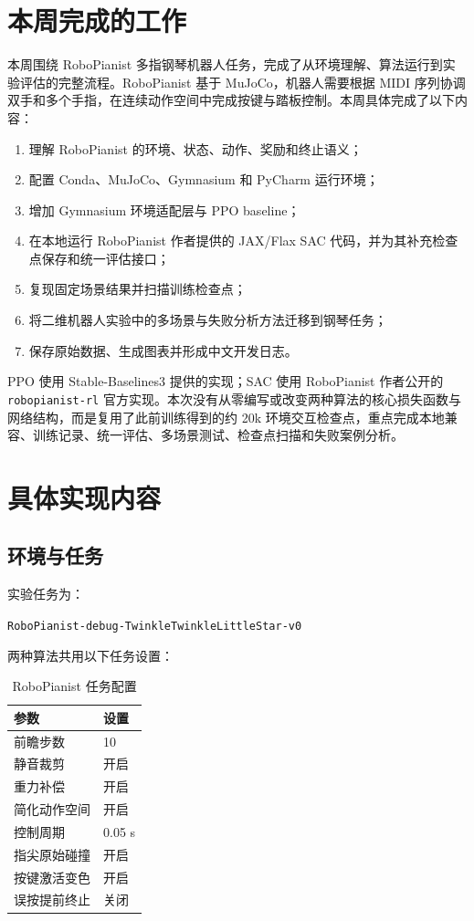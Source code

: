 \documentclass[UTF8,a4paper,11pt]{ctexart}
\begin{document}
\section{本周完成的工作}

本周围绕 RoboPianist 多指钢琴机器人任务，完成了从环境理解、算法运行到实验评估的完整流程。RoboPianist 基于 MuJoCo，机器人需要根据 MIDI 序列协调双手和多个手指，在连续动作空间中完成按键与踏板控制。本周具体完成了以下内容：
\begin{enumerate}
  \item 理解 RoboPianist 的环境、状态、动作、奖励和终止语义；
  \item 配置 Conda、MuJoCo、Gymnasium 和 PyCharm 运行环境；
  \item 增加 Gymnasium 环境适配层与 PPO baseline；
  \item 在本地运行 RoboPianist 作者提供的 JAX/Flax SAC 代码，并为其补充检查点保存和统一评估接口；
  \item 复现固定场景结果并扫描训练检查点；
  \item 将二维机器人实验中的多场景与失败分析方法迁移到钢琴任务；
  \item 保存原始数据、生成图表并形成中文开发日志。
\end{enumerate}

PPO 使用 Stable-Baselines3 提供的实现；SAC 使用 RoboPianist 作者公开的 \texttt{robopianist-rl} 官方实现。本次没有从零编写或改变两种算法的核心损失函数与网络结构，而是复用了此前训练得到的约 20k 环境交互检查点，重点完成本地兼容、训练记录、统一评估、多场景测试、检查点扫描和失败案例分析。

\section{具体实现内容}

\subsection{环境与任务}

实验任务为：
\begin{center}
\texttt{RoboPianist-debug-TwinkleTwinkleLittleStar-v0}
\end{center}

两种算法共用以下任务设置：
\begin{table}[H]
\centering
\caption{RoboPianist 任务配置}
\begin{tabular}{ll}
\toprule
参数 & 设置 \\
\midrule
前瞻步数 & 10 \\
静音裁剪 & 开启 \\
重力补偿 & 开启 \\
简化动作空间 & 开启 \\
控制周期 & 0.05 s \\
指尖原始碰撞 & 开启 \\
按键激活变色 & 开启 \\
误按提前终止 & 关闭 \\
\bottomrule
\end{tabular}
\end{table}
\end{document}
